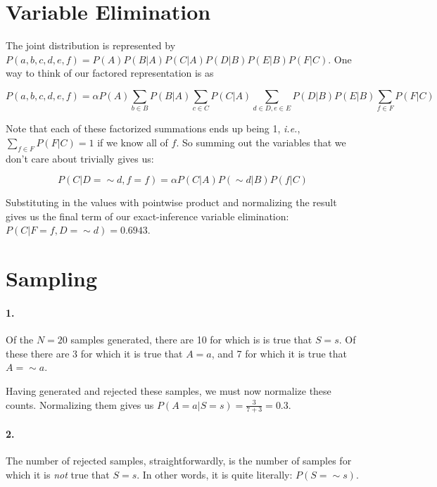\documentclass[11pt]{article}
\begin{document}
\section{Variable Elimination}

The joint distribution is represented by $P(a,b,c,d,e,f) = P(A)P(B|A)P(C|A)P(D|B)P(E|B)P(F|C)$. One way to think of our factored representation is as

\begin{equation}
P(a,b,c,d,e,f) = \alpha P(A) \sum_{b \in B} P(B|A) \sum_{c \in C} P(C|A) \sum_{d \in D, e \in E} P(D|B)P(E|B) \sum_{f \in F} P(F|C)
\end{equation}

Note that each of these factorized summations ends up being 1, \textit{i.e.}, $\sum_{f \in F} P(F|C) = 1$ if we know all of $f$. So summing out the variables that we don't care about trivially gives us:

\begin{equation}
P(C|D= \sim d, f = f) = \alpha P(C|A) P(\sim d|B) P(f|C)
\end{equation}

Substituting in the values with pointwise product and normalizing the result gives us the final term of our exact-inference variable elimination: $P(C | F=f, D= \sim d) = 0.6943$.



\section{Sampling}

\paragraph{1.} Of the $N = 20$ samples generated, there are 10 for which is is true that $S = s$. Of these there are 3 for which it is true that $A = a$, and 7 for which it is true that $A = \sim a$.

Having generated and rejected these samples, we must now normalize these counts. Normalizing them gives us $P(A=a|S=s) = \frac{3}{7+3} = 0.3$.

\paragraph{2.} The number of rejected samples, straightforwardly, is the number of samples for which it is \textit{not} true that $S = s$. In other words, it is quite literally: $P(S= \sim s)$.
\end{document}
